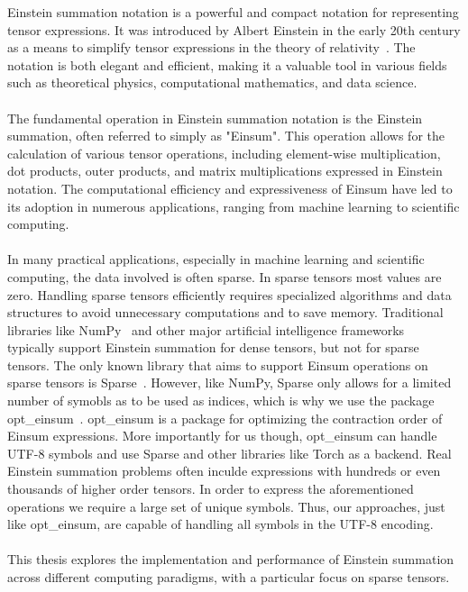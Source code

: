 Einstein summation notation is a powerful and compact notation for representing 
tensor expressions. It was introduced by Albert Einstein in the early 20th century 
as a means to simplify tensor expressions in the theory of relativity~\cite{einstein1916}.
The notation is both elegant and efficient, making it a valuable tool in various 
fields such as theoretical physics, computational mathematics, and data science.
\\\\
The fundamental operation in Einstein summation notation is the Einstein summation,
often referred to simply as "Einsum". This operation allows for the calculation of
various tensor operations, including element-wise multiplication, dot products,
outer products, and matrix multiplications expressed in Einstein notation. 
The computational efficiency and expressiveness of Einsum have led to its adoption in 
numerous applications, ranging from machine learning to scientific computing.
\\\\
In many practical applications, especially in machine learning and scientific computing,
the data involved is often sparse. In sparse tensors most values are zero. Handling sparse 
tensors efficiently requires specialized algorithms and data structures to avoid 
unnecessary computations and to save memory. Traditional libraries like NumPy~\cite{numpy} 
and other major artificial intelligence frameworks~\cite{tensorflow, pytorch} typically 
support Einstein summation for dense tensors, but not for sparse tensors. The only known 
library that aims to support Einsum operations on sparse tensors is Sparse~\cite{sparse}. 
However, like NumPy, Sparse only allows for a limited number of symobls as to be used as 
indices, which is why we use the package opt\_einsum~\cite{opt_einsum}. opt\_einsum is a 
package for optimizing the contraction order of Einsum expressions. More importantly for us 
though, opt\_einsum can handle UTF-8 symbols and use Sparse and other libraries like Torch 
as a backend. Real Einstein summation problems often inculde expressions with hundreds or 
even thousands of higher order tensors. In order to express the aforementioned operations 
we require a large set of unique symbols. Thus, our approaches, just like opt\_einsum, are 
capable of handling all symbols in the UTF-8 encoding.
\\\\
This thesis explores the implementation and performance of Einstein summation
across different computing paradigms, with a particular focus on sparse tensors.
